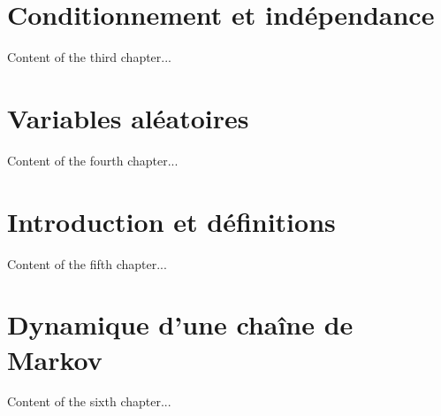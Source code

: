 \documentclass[pdflatex,sn-mathphys-num]{sn-jnl}
\begin{document}
\section{Conditionnement et indépendance}
\thispagestyle{plain} %
Content of the third chapter...

\section{Variables aléatoires}
\thispagestyle{plain} %
Content of the fourth chapter...

\section{Introduction et définitions}
\thispagestyle{plain} %
Content of the fifth chapter...

\section{Dynamique d’une chaîne de Markov}
\thispagestyle{plain} %
Content of the sixth chapter...


\end{document}
